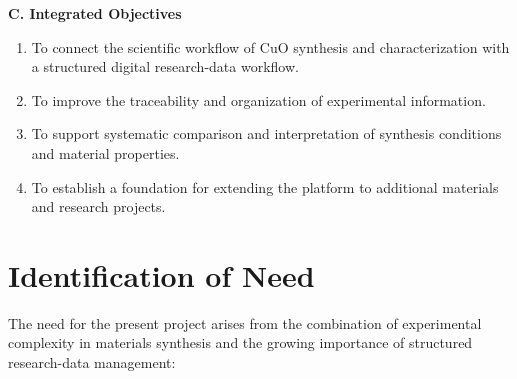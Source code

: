 \documentclass[12pt,a4paper,oneside]{report}
\begin{document}
{{{\noindent\textbf{C. Integrated Objectives}
\begin{enumerate}
    \item To connect the scientific workflow of $\text{CuO}$ synthesis and characterization with a structured digital research-data workflow.
    \item To improve the traceability and organization of experimental information.
    \item To support systematic comparison and interpretation of synthesis conditions and material properties.
    \item To establish a foundation for extending the platform to additional materials and research projects.
\end{enumerate}

\section{Identification of Need}

The need for the present project arises from the combination of experimental complexity in materials synthesis and the growing importance of structured research-data management:

}}}
\end{document}
